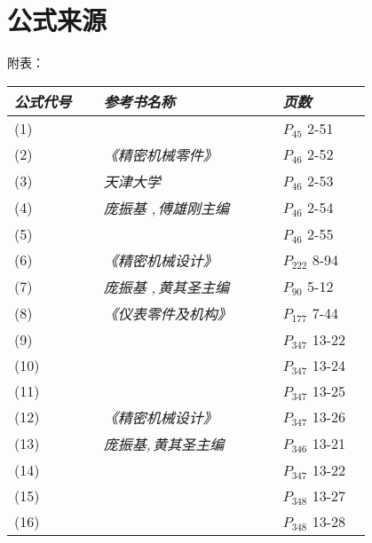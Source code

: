 \section{公式来源}
附表：
\begin{center}
\begin{tabular}{|>{\centering\arraybackslash}p{0.2\linewidth}|>{\centering\arraybackslash}p{0.4\linewidth}|>{\centering\arraybackslash}p{0.2\linewidth}|} \hline
\textit{公式代号}& \textit{参考书名称} & \textit{页数} \\ \hline
(1) &  & $P_{45}$ 2-51\\ \cline{1-1}\cline{3-3}
(2) & \textit{《精密机械零件》}& $P_{ 46}$ 2-52\\ \cline{1-1}\cline{3-3}
(3) &\textit{天津大学} & $P_{ 46}$ 2-53\\ \cline{1-1}\cline{3-3}
(4) & \textit{庞振基 ,\,傅雄刚主编}  & $P_{ 46}$ 2-54\\ \cline{1-1}\cline{3-3}
(5) &  & $P_{ 46}$ 2-55\\ \hline
(6) & \textit{《精密机械设计》} & $P_{ 222}$ 8-94\\ \cline{1-1}\cline{3-3}
(7) & \textit{庞振基 ,\,黄其圣主编} & $P_{ 90}$ 5-12\\ \hline
(8) & \textit{《仪表零件及机构》} & $P_{ 177}$ 7-44\\ \hline
(9) & & $P_{ 347}$  13-22\\ \cline{1-1}\cline{3-3}
(10) &  & $P_{ 347}$ 13-24\\ \cline{1-1}\cline{3-3}
(11) &  & $P_{ 347}$ 13-25\\ \cline{1-1}\cline{3-3}
(12) & \textit{《精密机械设计》}  & $P_{ 347}$ 13-26\\ \cline{1-1}\cline{3-3}
(13) & \textit{庞振基,\,黄其圣主编}& $P_{ 346}$ 13-21\\ \cline{1-1}\cline{3-3}
(14) &  & $P_{ 347}$ 13-22\\ \cline{1-1}\cline{3-3}
(15) & & $P_{ 348}$ 13-27\\ \cline{1-1}\cline{3-3}
(16) & & $P_{ 348}$ 13-28\\ \hline
\end{tabular}
\end{center}
